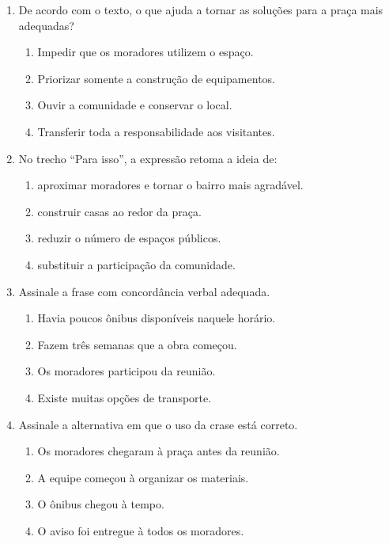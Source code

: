 \documentclass[12pt,a4paper]{article}
\begin{document}
\begin{enumerate}
  \item De acordo com o texto, o que ajuda a tornar as soluções para a praça mais adequadas?
  \begin{enumerate}[label=\alph*)]
    \item Impedir que os moradores utilizem o espaço.
    \item Priorizar somente a construção de equipamentos.
    \item Ouvir a comunidade e conservar o local.
    \item Transferir toda a responsabilidade aos visitantes.
  \end{enumerate}

  \item No trecho ``Para isso'', a expressão retoma a ideia de:
  \begin{enumerate}[label=\alph*)]
    \item aproximar moradores e tornar o bairro mais agradável.
    \item construir casas ao redor da praça.
    \item reduzir o número de espaços públicos.
    \item substituir a participação da comunidade.
  \end{enumerate}

  \item Assinale a frase com concordância verbal adequada.
  \begin{enumerate}[label=\alph*)]
    \item Havia poucos ônibus disponíveis naquele horário.
    \item Fazem três semanas que a obra começou.
    \item Os moradores participou da reunião.
    \item Existe muitas opções de transporte.
  \end{enumerate}

  \item Assinale a alternativa em que o uso da crase está correto.
  \begin{enumerate}[label=\alph*)]
    \item Os moradores chegaram à praça antes da reunião.
    \item A equipe começou à organizar os materiais.
    \item O ônibus chegou à tempo.
    \item O aviso foi entregue à todos os moradores.
  \end{enumerate}
\end{enumerate}
\end{document}
